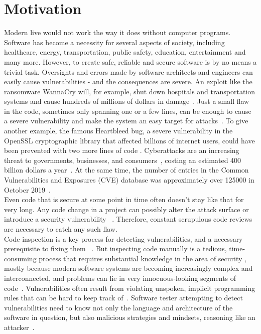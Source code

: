\documentclass[
a4paper,
pagesize,
pdftex,
12pt,
twoside, %
BCOR=5mm, %
ngerman,
fleqn,
final,
]{scrartcl}
\begin{document}
	
	\newpage
	\section{Motivation}\label{Motivation}
	Modern live would not work the way it does without computer programs. Software has become a necessity for several aspects of society, including healthcare, energy, transportation, public safety, education, entertainment and many more. However, to create safe, reliable and secure software is by no means a trivial task. Oversights and errors made by software architects and engineers can easily cause vulnerabilities - and the consequences are severe. An exploit like the ransomware WannaCry will, for example, shut down hospitals and transportation systems and cause hundreds of millions of dollars in damage~\cite{DanGoodin.2017}. Just a small flaw in the code, sometimes only spanning one or a few lines, can be enough to cause a severe vulnerability and make the system an easy target for attacks~\citep{Yamaguchi.2012}. To give another example, the famous Heartbleed bug, a severe vulnerability in the OpenSSL cryptographic library that affected billions of internet users, could have been prevented with two more lines of code \citep{Durumeric.2014}. Cyberattacks are an increasing threat to governments, businesses, and consumers~\cite{Dam.2017}, costing an estimated 400 billion dollars a year~\cite{Losses.2014}. At the same time, the number of entries in the Common Vulnerabilities and Exposures (CVE) database was approximately over 125000 in October 2019~\cite{CVE}.\\
	Even code that is secure at some point in time often doesn't stay like that for very long. Any code change in a project can possibly alter the attack surface or introduce a security vulnerability ~\cite{Morrison.2015}. Therefore, constant scrupulous code reviews are necessary to catch any such flaw.\\
	Code inspection is a key process for detecting vulnerabilities, and a necessary prerequisite to fixing them ~\cite{Yu.2019}. But inspecting code manually is a tedious, time-consuming process that requires substantial knowledge in the area of security \cite{Yamaguchi.2011}, mostly because modern software systems are becoming increasingly complex and interconnected, and problems can lie in very innocuous-looking segments of code~\cite{Pang.2015, Li.2018}. Vulnerabilities often result from violating unspoken, implicit programming rules that can be hard to keep track of~\cite{Li.2005}. Software tester attempting to detect vulnerabilities need to know not only the language and architecture of the software in question, but also malicious strategies and mindsets, reasoning like an attacker~\cite{Pang.2015}.\\
\end{document}

